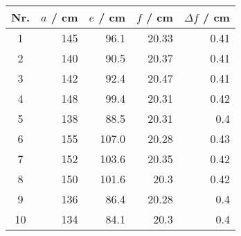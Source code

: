 \begin{tabular}{c|rrrr}
Nr. & $a$ / cm & $e$ / cm & $f$ / cm & $\Delta f$ / cm \\
\hline
1 & 145 & 96.1 & 20.33 & 0.41\\
2 & 140 & 90.5 & 20.37 & 0.41\\
3 & 142 & 92.4 & 20.47 & 0.41\\
4 & 148 & 99.4 & 20.31 & 0.42\\
5 & 138 & 88.5 & 20.31 & 0.4\\
6 & 155 & 107.0 & 20.28 & 0.43\\
7 & 152 & 103.6 & 20.35 & 0.42\\
8 & 150 & 101.6 & 20.3 & 0.42\\
9 & 136 & 86.4 & 20.28 & 0.4\\
10 & 134 & 84.1 & 20.3 & 0.4
\end{tabular}
